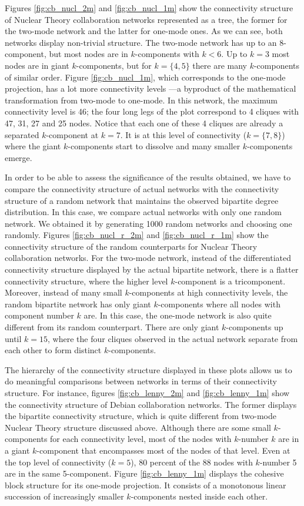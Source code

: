 Figures \ref{fig:cb_nucl_2m} and \ref{fig:cb_nucl_1m} show the connectivity structure of Nuclear Theory collaboration networks represented as a tree, the former for the two-mode network and the latter for one-mode ones. As we can see, both networks display non-trivial structure. The two-mode network has up to an 8-component, but most nodes are in $k$-components with $k < 6$. Up to $k = 3$ most nodes are in giant $k$-components, but for $k = \{4,5\}$ there are many $k$-components of similar order. Figure \ref{fig:cb_nucl_1m}, which corresponds to the one-mode projection, has a lot more connectivity levels ---a byproduct of the mathematical transformation from two-mode to one-mode. In this network, the maximum connectivity level is 46; the four long legs of the plot correspond to 4 cliques with 47, 31, 27 and 25 nodes. Notice that each one of these 4 cliques are already a separated $k$-component at $k=7$. It is at this level of connectivity ($k=\{7,8\}$) where the giant $k$-components start to dissolve and many smaller $k$-components emerge.

In order to be able to assess the significance of the results obtained, we have to compare the connectivity structure of actual networks with the connectivity structure of a random network that maintains the observed bipartite degree distribution. In this case, we compare actual networks with only one random network. We obtained it by generating 1000 random networks and choosing one randomly. Figures \ref{fig:cb_nucl_r_2m} and \ref{fig:cb_nucl_r_1m} show the connectivity structure of the random counterparts for Nuclear Theory collaboration networks. For the two-mode network, instead of the differentiated connectivity structure displayed by the actual bipartite network, there is a flatter connectivity structure, where the higher level $k$-component is a tricomponent. Moreover, instead of many small $k$-components at high connectivity levels, the random bipartite network has only giant $k$-components where all nodes with component number $k$ are. In this case, the one-mode network is also quite different from its random counterpart. There are only giant $k$-components up until $k=15$, where the four cliques observed in the actual network separate from each other to form distinct $k$-components.

The hierarchy of the connectivity structure displayed in these plots allows us to do meaningful comparisons between networks in terms of their connectivity structure. For instance, figures \ref{fig:cb_lenny_2m} and \ref{fig:cb_lenny_1m} show the connectivity structure of Debian collaboration networks. The former displays the bipartite connectivity structure, which is quite different from two-mode Nuclear Theory structure discussed above. Although there are some small $k$-components for each connectivity level, most of the nodes with $k$-number $k$ are in a giant $k$-component that encompasses most of the nodes of that level. Even at the top level of connectivity ($k=5$), 80 percent of the 88 nodes with $k$-number 5 are in the same 5-component. Figure \ref{fig:cb_lenny_1m} displays the cohesive block structure for its one-mode projection. It consists of a monotonous linear succession of increasingly smaller $k$-components nested inside each other. 

